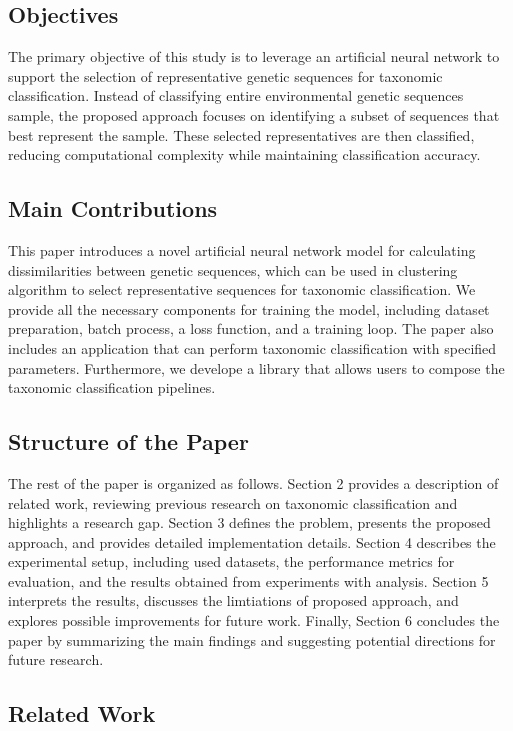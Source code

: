 \documentclass[pdflatex,sn-vancouver-num]{sn-jnl}%
\begin{document}
        \subsection{Objectives}
            The primary objective of this study is to leverage an artificial neural network to support the selection of representative genetic sequences for taxonomic classification. Instead of classifying entire environmental genetic sequences sample, the proposed approach focuses on identifying a subset of sequences that best represent the sample. These selected representatives are then classified, reducing computational complexity while maintaining classification accuracy.

        \subsection{Main Contributions}
            This paper introduces a novel artificial neural network model for calculating dissimilarities between genetic sequences, which can be used in clustering algorithm to select representative sequences for taxonomic classification. We provide all the necessary components for training the model, including dataset preparation, batch process, a loss function, and a training loop. The paper also includes an application that can perform taxonomic classification with specified parameters. Furthermore, we develope a library that allows users to compose the taxonomic classification pipelines.

        \subsection{Structure of the Paper}
            The rest of the paper is organized as follows. Section 2 provides a description of related work, reviewing previous research on taxonomic classification and highlights a research gap. Section 3 defines the problem, presents the proposed approach, and provides detailed implementation details. Section 4 describes the experimental setup, including used datasets, the performance metrics for evaluation, and the results obtained from experiments with analysis. Section 5 interprets the results, discusses the limtiations of proposed approach, and explores possible improvements for future work. Finally, Section 6 concludes the paper by summarizing the main findings and suggesting potential directions for future research.

        \subsection{Related Work}
\end{document}
